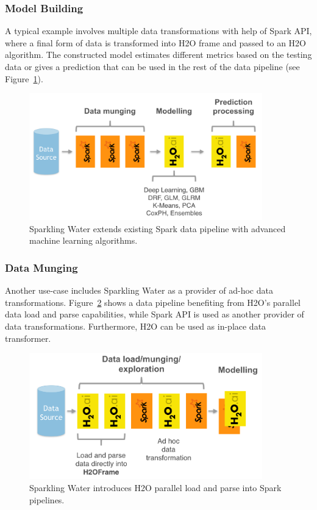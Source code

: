 \documentclass{standalone}
\begin{document}
\subsubsection{Model Building}
A typical example involves multiple data transformations with help of Spark API, where a final form of data is transformed into H2O frame and passed to an H2O algorithm. The constructed model estimates different metrics based on the testing data or gives a prediction that can be used in the rest of the data pipeline (see Figure~\ref{fig:uc1}).
\begin{figure}[h!]
	\centering
	\includegraphics[width=0.9\textwidth]{../images/uc1.png}
	\caption{Sparkling Water extends existing Spark data pipeline with advanced machine learning algorithms.}
	\label{fig:uc1} 
\end{figure}

\subsubsection{Data Munging}
Another use-case includes Sparkling Water as a provider of ad-hoc data transformations. Figure~\ref{fig:uc2} shows a data pipeline benefiting from H2O's parallel data load and parse capabilities, while Spark API is used as another provider of data transformations. Furthermore, H2O can be used as in-place data transformer.

\begin{figure}[h!]
	\centering
	\includegraphics[width=0.9\textwidth]{../images/uc2.png}
	\caption{Sparkling Water introduces H2O parallel load and parse into Spark pipelines.}
	\label{fig:uc2} 
\end{figure}
\end{document}
